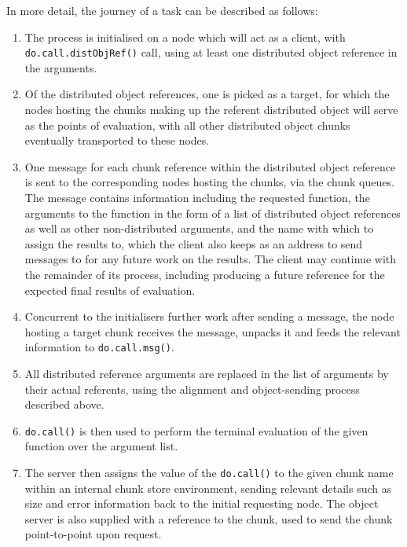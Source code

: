 \documentclass[a4paper,10pt]{article}
\begin{document}
In more detail, the journey of a task can be described as follows:

\begin{enumerate}
	\item The process is initialised on a node which will act as a client,
		with \texttt{do.call.distObjRef()} call, using at least
		one distributed object reference in the arguments.

	\item Of the distributed object references, one is picked as a target,
		for which the nodes hosting the chunks making up the referent
		distributed object will serve as the points of evaluation, with
		all other distributed object chunks eventually transported to
		these nodes.

	\item One message for each chunk reference within the distributed
		object reference is sent to the corresponding nodes hosting the
		chunks, via the chunk queues. 
		The message contains information including the requested
		function, the arguments to the function in the form of a list
		of distributed object references as well as other
		non-distributed arguments, and the name with which to assign
		the results to, which the client also keeps as an address to
		send messages to for any future work on the results.  
		The client may continue with the remainder of its process,
		including producing a future reference for the expected final
		results of evaluation.

	\item Concurrent to the initialisers further work after sending a
		message, the node hosting a target chunk receives the message,
		unpacks it and feeds the relevant information to
		\texttt{do.call.msg()}.

	\item All distributed reference arguments are replaced in the list of
		arguments by their actual referents, using the alignment and
		object-sending process described above.

	\item \texttt{do.call()} is then used to perform the terminal
		evaluation of the given function over the argument list.

	\item The server then assigns the value of the
		\texttt{do.call()} to the given chunk name within an
		internal chunk store environment, sending relevant details such
		as size and error information back to the initial requesting
		node.  The object server is also supplied with a reference to
		the chunk, used to send the chunk point-to-point upon request.
\end{enumerate}
\end{document}
